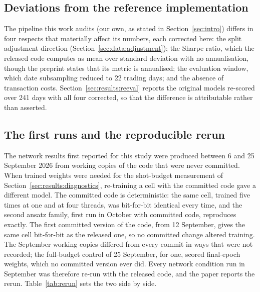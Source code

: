 \subsection{Deviations from the reference implementation}
The pipeline this work audits (our own, as stated in
Section~\ref{sec:intro}) differs in four respects that materially affect its
numbers, each corrected here: the split adjustment direction
(Section~\ref{sec:data:adjustment}); the Sharpe ratio, which the released code
computes as mean over standard deviation with no annualisation, though the
preprint states that its metric is annualised; the evaluation window,
which date subsampling reduced to \num{22} trading days; and the absence of
transaction costs. Section~\ref{sec:results:reeval} reports the original models
re-scored over \num{241} days with all four corrected, so that the difference
is attributable rather than asserted.

\subsection{The first runs and the reproducible rerun}
\label{sec:app:rerun}
The network results first reported for this study were produced between 6 and
25 September 2026 from working copies of the code that were never committed. When trained weights
were needed for the shot-budget measurement of Section~\ref{sec:results:diagnostics},
re-training a cell with the committed code gave a different model. The
committed code is deterministic: the same cell, trained five times at one
and at four threads, was bit-for-bit identical every time, and the second
ansatz family, first run in October with committed code, reproduces exactly.
The first committed version of the code, from 12 September, gives the same
cell bit-for-bit as the released one, so no committed change altered training.
The September working copies differed from every commit in ways that were not
recorded; the full-budget control of 25 September, for one, scored final-epoch
weights, which no committed version ever did. Every network condition run in September was therefore
re-run with the released code, and the paper reports the rerun.
Table~\ref{tab:rerun} sets the two side by side.



